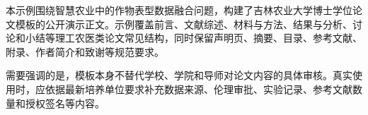 本示例围绕智慧农业中的作物表型数据融合问题，构建了吉林农业大学博士学位论文模板的公开演示正文。示例覆盖前言、文献综述、材料与方法、结果与分析、讨论和小结等理工农医类论文常见结构，同时保留声明页、摘要、目录、参考文献、附录、作者简介和致谢等规范要求。

需要强调的是，模板本身不替代学校、学院和导师对论文内容的具体审核。真实使用时，应依据最新培养单位要求补充数据来源、伦理审批、实验记录、参考文献数量和授权签名等内容。

